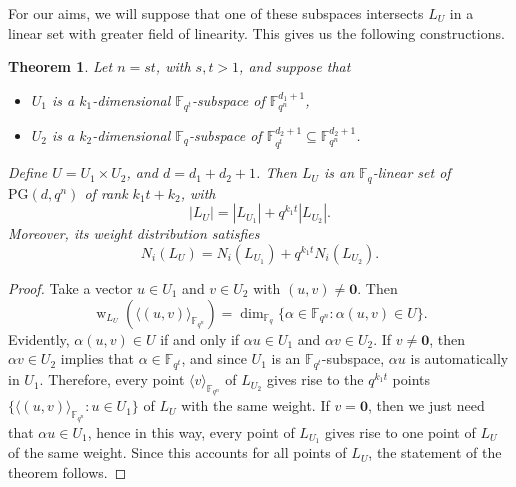 \documentclass[11pt]{article}
\newtheorem{theorem}{Theorem}[section]
\theoremstyle{definition}
\newtheorem{remark}[theorem]{Remark}
\newcommand{\fqn}{\mathbb{F}_{q^n}}
\newcommand{\F}{{\mathbb F}}
\newcommand{\fq}{{\mathbb F}_{q}}
\newcommand{\PG}{\mathrm{PG}}
\DeclareMathOperator{\ww}{w}
\begin{document}
For our aims, we will suppose that one of these subspaces intersects $L_U$ in a linear set with greater field of linearity.
This gives us the following constructions.

\begin{theorem}
 \label{th:contructionfromqt2}
Let $n=st$, with $s,t>1$, and suppose that
\begin{itemize}
 \item $U_1$ is a $k_1$-dimensional $\F_{q^t}$-subspace of $\fqn^{d_1+1}$,
 \item $U_2$ is a $k_2$-dimensional $\fq$-subspace of $\F_{q^t}^{d_2+1} \subseteq \F_{q^n}^{d_2+1}$.
\end{itemize}
Define $U = U_1 \times U_2$, and $d = d_1 + d_2 + 1$.
Then $L_U$ is an $\fq$-linear set of $\PG(d,q^n)$ of rank $k_1 t + k_2$, with
\[
 |L_U| = |L_{U_1}| + q^{k_1 t} |L_{U_2}|.
\]
Moreover, its weight distribution satisfies
\[
 N_i(L_U) = N_i(L_{U_1}) + q^{k_1 t} N_i(L_{U_2}).
\]
\end{theorem}

\begin{proof}
Take a vector $u \in U_1$ and $v \in U_2$ with $(u,v) \neq \mathbf 0$.
Then
\[
 \ww_{L_U}(\langle (u,v) \rangle_{\fqn})
 = \dim_{\fq} \{ \alpha \in \fqn : \alpha (u,v) \in U \}.
\]
Evidently, $\alpha (u,v) \in U$ if and only if $\alpha u \in U_1$ and $\alpha v \in U_2$.
If $v \neq \mathbf 0$, then $\alpha v \in U_2$ implies that $\alpha \in \F_{q^t}$, and since $U_1$ is an $\F_{q^t}$-subspace, $\alpha u$ is automatically in $U_1$.
Therefore, every point $\langle v \rangle_{\fqn}$ of $L_{U_2}$ gives rise to the $q^{k_1 t}$ points $\{ \langle (u,v) \rangle_{\fqn} : u \in U_1 \}$ of $L_{U}$ with the same weight.
If $v = \mathbf 0$, then we just need that $\alpha u \in U_1$, hence in this way, every point of $L_{U_1}$ gives rise to one point of $L_U$ of the same weight.
Since this accounts for all points of $L_U$, the statement of the theorem follows.
\end{proof}

\end{document}

